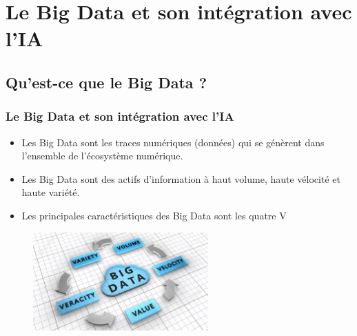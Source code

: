 \documentclass{beamer}
\begin{document}
	

\section{Le Big Data et son intégration avec l'IA}
\subsection{Qu'est-ce que le Big Data ?}
\begin{frame}
	\frametitle{Le Big Data et son intégration avec l'IA}
	
	\begin{itemize}
		\item Les Big Data sont les traces numériques (données) qui se génèrent dans l'ensemble de l'écosystème numérique.
		\item Les Big Data sont des actifs d'information à haut volume, haute vélocité et haute variété.
		
		\item Les principales caractéristiques des Big Data sont les quatre V 
	\end{itemize}
	
	\begin{figure}
		\centering
		\includegraphics[width=0.6\textwidth]{bigDa.jpg}
	\end{figure}
	
\end{frame}

\end{document}

